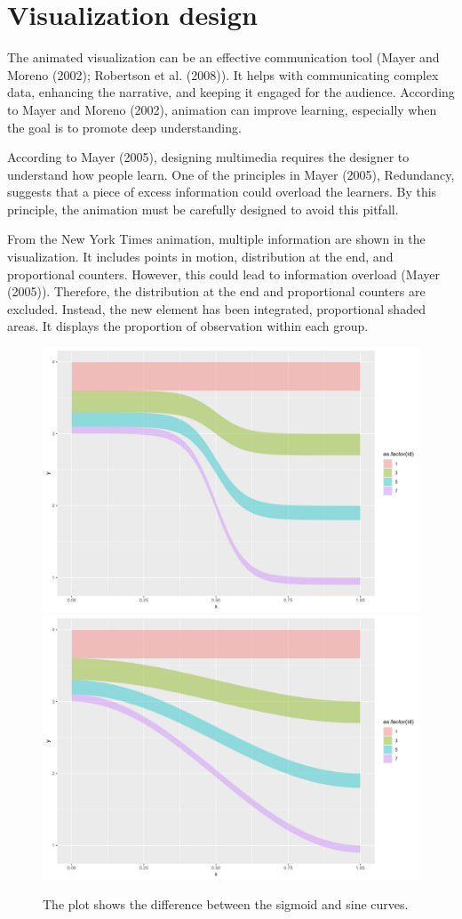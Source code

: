 \hypertarget{visualization-design}{%
\section{Visualization design}\label{visualization-design}}

The animated visualization can be an effective communication tool (Mayer and Moreno (2002); Robertson et al. (2008)). It helps with communicating complex data, enhancing the narrative, and keeping it engaged for the audience. According to Mayer and Moreno (2002), animation can improve learning, especially when the goal is to promote deep understanding.

According to Mayer (2005), designing multimedia requires the designer to understand how people learn. One of the principles in Mayer (2005), Redundancy, suggests that a piece of excess information could overload the learners. By this principle, the animation must be carefully designed to avoid this pitfall.

From the New York Times animation, multiple information are shown in the visualization. It includes points in motion, distribution at the end, and proportional counters. However, this could lead to information overload (Mayer (2005)). Therefore, the distribution at the end and proportional counters are excluded. Instead, the new element has been integrated, proportional shaded areas. It displays the proportion of observation within each group.

\begin{figure}
\includegraphics[width=0.5\linewidth]{figures/sigmoid-shade} \includegraphics[width=0.5\linewidth]{figures/sine-shade} \caption{The plot shows the difference between the sigmoid and sine curves.}\label{fig:proportional-shade}
\end{figure}

